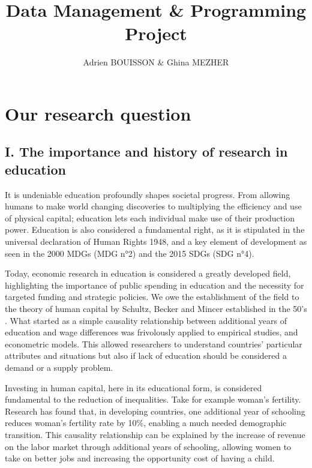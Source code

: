 \documentclass[
  letterpaper,
  DIV=11,
  numbers=noendperiod]{scrartcl}
\title{Data Management \& Programming Project}
\author{Adrien BOUISSON \& Ghina MEZHER}
\date{}
\begin{document}
\maketitle
\ifdefined\Shaded\renewenvironment{Shaded}{\begin{tcolorbox}[sharp corners, borderline west={3pt}{0pt}{shadecolor}, frame hidden, enhanced, breakable, interior hidden, boxrule=0pt]}{\end{tcolorbox}}\fi

\hypertarget{our-research-question}{%
\section{Our research question}\label{our-research-question}}

\hypertarget{i.-the-importance-and-history-of-research-in-education}{%
\subsection{I. The importance and history of research in
education}\label{i.-the-importance-and-history-of-research-in-education}}

It is undeniable education profoundly shapes societal progress. From
allowing humans to make world changing discoveries to multiplying the
efficiency and use of physical capital; education lets each individual
make use of their production power. Education is also considered a
fundamental right, as it is stipulated in the universal declaration of
Human Rights 1948, and a key element of development as seen in the 2000
MDGs (MDG n°2) and the 2015 SDGs (SDG n°4).

Today, economic research in education is considered a greatly developed
field, highlighting the importance of public spending in education and
the necessity for targeted funding and strategic policies. We owe the
establishment of the field to the theory of human capital by Schultz,
Becker and Mincer established in the 50's . What started as a simple
causality relationship between additional years of education and wage
differences was frivolously applied to empirical studies, and
econometric models. This allowed researchers to understand countries'
particular attributes and situations but also if lack of education
should be considered a demand or a supply problem.

Investing in human capital, here in its educational form, is considered
fundamental to the reduction of inequalities. Take for example woman's
fertility. Research has found that, in developing countries, one
additional year of schooling reduces woman's fertility rate by 10\%,
enabling a much needed demographic transition. This causality
relationship can be explained by the increase of revenue on the labor
market through additional years of schooling, allowing women to take on
better jobs and increasing the opportunity cost of having a child.
\end{document}
